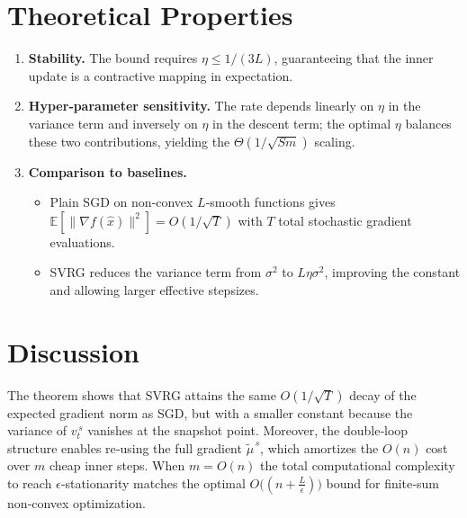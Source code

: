 \documentclass{article}
\newcommand{\E}{\mathbb{E}}
\begin{document}
\section*{Theoretical Properties}
\begin{enumerate}[label=\arabic*.]
\item \textbf{Stability.} The bound requires $\eta\le 1/(3L)$, guaranteeing that the inner update is a contractive mapping in expectation.
\item \textbf{Hyper‑parameter sensitivity.} The rate depends linearly on $\eta$ in the variance term and inversely on $\eta$ in the descent term; the optimal $\eta$ balances these two contributions, yielding the $\Theta(1/\sqrt{Sm})$ scaling.
\item \textbf{Comparison to baselines.}
    \begin{itemize}
        \item Plain SGD on non‑convex $L$‑smooth functions gives $\E[\|\nabla f(\hat{x})\|^{2}]=O(1/\sqrt{T})$ with $T$ total stochastic gradient evaluations.
        \item SVRG reduces the variance term from $\sigma^{2}$ to $L\eta\sigma^{2}$, improving the constant and allowing larger effective stepsizes.
    \end{itemize}
\end{enumerate}

\section*{Discussion}
The theorem shows that SVRG attains the same $O(1/\sqrt{T})$ decay of the expected gradient norm as SGD, but with a smaller constant because the variance of $v_t^{\,s}$ vanishes at the snapshot point.  Moreover, the double‑loop structure enables re‑using the full gradient $\tilde{\mu}^{\,s}$, which amortizes the $O(n)$ cost over $m$ cheap inner steps.  When $m=O(n)$ the total computational complexity to reach $\epsilon$‑stationarity matches the optimal $O\!\bigl((n+\frac{L}{\epsilon})\bigr)$ bound for finite‑sum non‑convex optimization.
\end{document}
